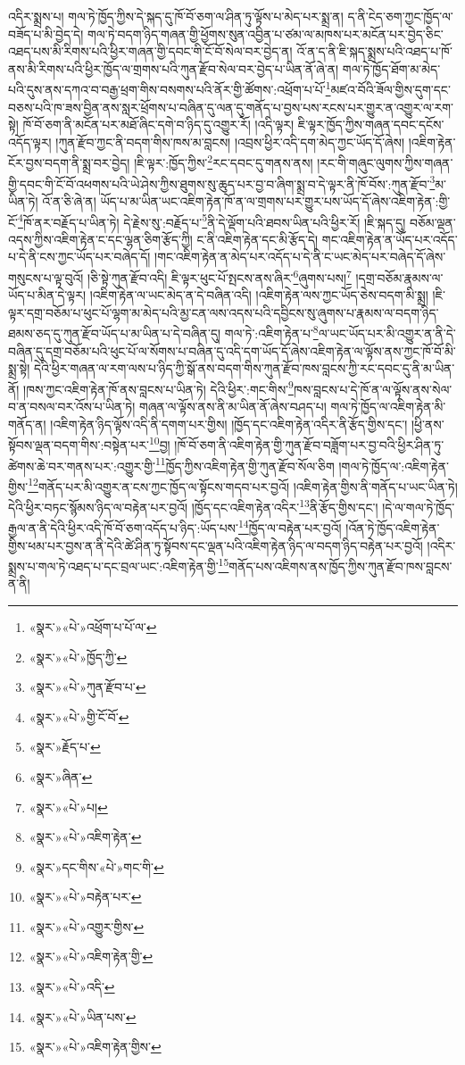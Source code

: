 འདིར་སྨྲས་པ། གལ་ཏེ་ཁྱོད་ཀྱིས་དེ་སྐད་དུ་ཁོ་བོ་ཅག་ལ་ཤིན་ཏུ་ལྟོས་པ་མེད་པར་སྨྲ་ན། ད་ནི་ངེད་ཅག་ཀྱང་ཁྱོད་ལ་བཟོད་པ་མི་བྱེད་དེ། གལ་ཏེ་བདག་ཉིད་གཞན་གྱི་ཕྱོགས་སུན་འབྱིན་པ་ཙམ་ལ་མཁས་པར་མངོན་པར་བྱེད་ཅིང་འཐད་པས་མི་རིགས་པའི་ཕྱིར་གཞན་གྱི་དབང་གི་ངོ་བོ་སེལ་བར་བྱེད་ན། འོ་ན་ད་ནི་ཇི་སྐད་སྨྲས་པའི་འཐད་པ་ཁོ་ནས་མི་རིགས་པའི་ཕྱིར་ཁྱོད་ལ་གྲགས་པའི་ཀུན་རྫོབ་སེལ་བར་བྱེད་པ་ཡིན་ནོ་ཞེ་ན། གལ་ཏེ་ཁྱོད་ཐོག་མ་མེད་པའི་དུས་ནས་དཀའ་བ་བརྒྱ་ཕྲག་གིས་བསགས་པའི་ནོར་གྱི་ཚོགས་:འཕྲོག་པ་པོ་\footnote{«སྣར་»«པེ་»འཕྲོག་པ་པོ་ལ་}མཛའ་བོའི་ཟོལ་གྱིས་དུག་དང་བཅས་པའི་ཁ་ཟས་བྱིན་ནས་སླར་ཕྲོགས་པ་བཞིན་དུ་ལན་དུ་གནོད་པ་བྱས་པས་རངས་པར་གྱུར་ན་འགྱུར་ལ་རག་སྟེ། ཁོ་བོ་ཅག་ནི་མངོན་པར་མཐོ་ཞིང་དགེ་བ་ཉིད་དུ་འགྱུར་རོ། །འདི་ལྟར། ཇི་ལྟར་ཁྱོད་ཀྱིས་གཞན་དབང་དངོས་འདོད་ལྟར། །ཀུན་རྫོབ་ཀྱང་ནི་བདག་གིས་ཁས་མ་བླངས། །འབྲས་ཕྱིར་འདི་དག་མེད་ཀྱང་ཡོད་དོ་ཞེས། །འཇིག་རྟེན་ངོར་བྱས་བདག་ནི་སྨྲ་བར་བྱེད། །ཇི་ལྟར་:ཁྱོད་ཀྱིས་\footnote{«སྣར་»«པེ་»ཁྱོད་ཀྱི་}རང་དབང་དུ་གནས་ནས། །རང་གི་གཞུང་ལུགས་ཀྱིས་གཞན་གྱི་དབང་གི་ངོ་བོ་འཕགས་པའི་ཡེ་ཤེས་ཀྱིས་ཐུགས་སུ་ཆུད་པར་བྱ་བ་ཞིག་སྨྲ་བ་དེ་ལྟར་ནི་ཁོ་བོས་:ཀུན་རྫོབ་\footnote{«སྣར་»«པེ་»ཀུན་རྫོབ་པ་}མ་ཡིན་ཏེ། འོ་ན་ཅི་ཞེ་ན། ཡོད་པ་མ་ཡིན་ཡང་འཇིག་རྟེན་ཁོ་ན་ལ་གྲགས་པར་གྱུར་པས་ཡོད་དོ་ཞེས་འཇིག་རྟེན་:གྱི་ངོ་\footnote{«སྣར་»«པེ་»གྱི་ངོ་བོ་}ཁོ་ནར་བརྗོད་པ་ཡིན་ཏེ། དེ་རྗེས་སུ་:བརྗོད་པ་\footnote{«སྣར་»རྗོད་པ་}ནི་དེ་ལྡོག་པའི་ཐབས་ཡིན་པའི་ཕྱིར་རོ། །ཇི་སྐད་དུ། བཅོམ་ལྡན་འདས་ཀྱིས་འཇིག་རྟེན་ང་དང་ལྷན་ཅིག་རྩོད་ཀྱི། ང་ནི་འཇིག་རྟེན་དང་མི་རྩོད་དེ། གང་འཇིག་རྟེན་ན་ཡོད་པར་འདོད་པ་དེ་ནི་ངས་ཀྱང་ཡོད་པར་བཞེད་དོ། །གང་འཇིག་རྟེན་ན་མེད་པར་འདོད་པ་དེ་ནི་ང་ཡང་མེད་པར་བཞེད་དོ་ཞེས་གསུངས་པ་ལྟ་བུའོ། །ཅི་སྟེ་ཀུན་རྫོབ་འདི། ཇི་ལྟར་ཕུང་པོ་སྤངས་ནས་ཞིར་\footnote{«སྣར་»ཞིན་}ཞུགས་པས།\footnote{«སྣར་»«པེ་»པ།} །དགྲ་བཅོམ་རྣམས་ལ་ཡོད་པ་མིན་དེ་ལྟར། །འཇིག་རྟེན་ལ་ཡང་མེད་ན་དེ་བཞིན་འདི། །འཇིག་རྟེན་ལས་ཀྱང་ཡོད་ཅེས་བདག་མི་སྨྲ། །ཇི་ལྟར་དགྲ་བཅོམ་པ་ཕུང་པོ་ལྷག་མ་མེད་པའི་མྱ་ངན་ལས་འདས་པའི་དབྱིངས་སུ་ཞུགས་པ་རྣམས་ལ་བདག་ཉིད་ཐམས་ཅད་དུ་ཀུན་རྫོབ་ཡོད་པ་མ་ཡིན་པ་དེ་བཞིན་དུ། གལ་ཏེ་:འཇིག་རྟེན་པ་\footnote{«སྣར་»«པེ་»འཇིག་རྟེན་}ལ་ཡང་ཡོད་པར་མི་འགྱུར་ན་ནི་དེ་བཞིན་དུ་དགྲ་བཅོམ་པའི་ཕུང་པོ་ལ་སོགས་པ་བཞིན་དུ་འདི་དག་ཡོད་དོ་ཞེས་འཇིག་རྟེན་ལ་ལྟོས་ནས་ཀྱང་ཁོ་བོ་མི་སྨྲ་སྟེ། དེའི་ཕྱིར་གཞན་ལ་རག་ལས་པ་ཉིད་ཀྱི་སྒོ་ནས་བདག་གིས་ཀུན་རྫོབ་ཁས་བླངས་ཀྱི་རང་དབང་དུ་ནི་མ་ཡིན་ནོ། །ཁས་ཀྱང་འཇིག་རྟེན་ཁོ་ནས་བླངས་པ་ཡིན་ཏེ། དེའི་ཕྱིར་:གང་གིས་\footnote{«སྣར་»དང་གིས་«པེ་»གང་གི་}ཁས་བླངས་པ་དེ་ཁོ་ན་ལ་ལྟོས་ནས་སེལ་བ་ན་བསལ་བར་འོས་པ་ཡིན་ཏེ། གཞན་ལ་ལྟོས་ནས་ནི་མ་ཡིན་ནོ་ཞེས་བཤད་པ། གལ་ཏེ་ཁྱོད་ལ་འཇིག་རྟེན་མི་གནོད་ན། །འཇིག་རྟེན་ཉིད་ལྟོས་འདི་ནི་དགག་པར་གྱིས། །ཁྱོད་དང་འཇིག་རྟེན་འདིར་ནི་རྩོད་གྱིས་དང་། །ཕྱི་ནས་སྟོབས་ལྡན་བདག་གིས་:བསྟེན་པར་\footnote{«སྣར་»«པེ་»བརྟེན་པར་}བྱ། །ཁོ་བོ་ཅག་ནི་འཇིག་རྟེན་གྱི་ཀུན་རྫོབ་བཟློག་པར་བྱ་བའི་ཕྱིར་ཤིན་ཏུ་ཚེགས་ཆེ་བར་གནས་པར་:འགྱུར་གྱི་\footnote{«སྣར་»«པེ་»འགྱུར་གྱིས་}ཁྱོད་ཀྱིས་འཇིག་རྟེན་གྱི་ཀུན་རྫོབ་སོལ་ཅིག །གལ་ཏེ་ཁྱོད་ལ་:འཇིག་རྟེན་གྱིས་\footnote{«སྣར་»«པེ་»འཇིག་རྟེན་གྱི་}གནོད་པར་མི་འགྱུར་ན་ངས་ཀྱང་ཁྱོད་ལ་སྟོངས་གདབ་པར་བྱའོ། །འཇིག་རྟེན་གྱིས་ནི་གནོད་པ་ཡང་ཡིན་ཏེ། དེའི་ཕྱིར་བཏང་སྙོམས་ཉིད་ལ་བརྟེན་པར་བྱའོ། །ཁྱོད་དང་འཇིག་རྟེན་འདིར་\footnote{«སྣར་»«པེ་»འདི་}ནི་རྩོད་གྱིས་དང་། །དེ་ལ་གལ་ཏེ་ཁྱོད་རྒྱལ་ན་ནི་དེའི་ཕྱིར་འདི་ཁོ་བོ་ཅག་འདོད་པ་ཉིད་:ཡོད་པས་\footnote{«སྣར་»«པེ་»ཡིན་པས་}ཁྱོད་ལ་བརྟེན་པར་བྱའོ། །འོན་ཏེ་ཁྱོད་འཇིག་རྟེན་གྱིས་ཕམ་པར་བྱས་ན་ནི་དེའི་ཚེ་ཤིན་ཏུ་སྟོབས་དང་ལྡན་པའི་འཇིག་རྟེན་ཉིད་ལ་བདག་ཉིད་བརྟེན་པར་བྱའོ། །འདིར་སྨྲས་པ་གལ་ཏེ་འཐད་པ་དང་བྲལ་ཡང་:འཇིག་རྟེན་གྱི་\footnote{«སྣར་»«པེ་»འཇིག་རྟེན་གྱིས་}གནོད་པས་འཇིགས་ནས་ཁྱོད་ཀྱིས་ཀུན་རྫོབ་ཁས་བླངས་ན་ནི། 